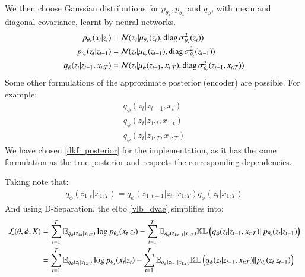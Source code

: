We then choose Gaussian distributions for $p_{\theta_x}, p_{\theta_z}$ and $q_\phi$, with mean and diagonal covariance, learnt by neural networks.
\begin{align}
    p_{\theta_x}(x_t \vert z_t) &= \mathcal{N}( x_t \vert \mu_{\theta_x}(z_t), \text{diag}\, \sigma_{\theta_x}^2(z_t))\\
    p_{\theta_z}(z_t \vert z_{t-1}) &= \mathcal{N}( z_t \vert \mu_{\theta_z}(z_{t-1}), \text{diag}\, \sigma_{\theta_z}^2(z_{t-1}))\\
    q_{\phi}(z_t \vert z_{t-1}, x_{t:T}) &= \mathcal{N}( z_t \vert \mu_{\phi}(z_{t-1}, x_{t:T}), \text{diag}\, \sigma_{\theta_z}^2(z_{t-1},x_{t:T}))
\end{align}
Some other formulations of the approximate posterior (encoder) are possible. For example:
\begin{align*}
    q_{\phi}(z_t \vert z_{t-1}, x_t) \\
    q_{\phi}(z_t \vert z_{1:t}, x_{1:t}) \\
    q_{\phi}(z_t \vert z_{1:T}, x_{1:T})
\end{align*}
We have chosen \ref{dkf_posterior} for the implementation, as it has the same formulation as the true posterior and respects the corresponding dependencies.

Taking note that:
\begin{align*}
    q_{\phi}(z_{1:t} \vert x_{1:T}) = q_{\phi}(z_{1:t-1} \vert z_t, x_{1:T}) q_{\phi}(z_t \vert x_{1:T})
\end{align*}
And using D-Separation, the \gls{elbo} \ref{vlb_dvae} simplifies into:
\begin{align}
    \mathcal{L}(\theta, \phi, X) &= \sum_{t=1}^T \mathbb{E}_{q_\phi(z_{1:t} \vert x_{1:T})} \log{p_{\theta_x}(x_t \vert z_t)} - \sum_{t=1}^T \mathbb{E}_{q_\phi(z_{1:t-1} \vert x_{1:T})} \mathbb{KL}\left( q_{\phi}(z_t \vert z_{t-1}, x_{t:T}) \vert\vert p_{\theta_z}(z_t \vert z_{t-1}) \right) \\
    &= \sum_{t=1}^T \mathbb{E}_{q_\phi(z_{t} \vert x_{1:T})} \log{p_{\theta_x}(x_t \vert z_t)} - \sum_{t=1}^T \mathbb{E}_{q_\phi(z_{t-1} \vert x_{1:T})} \mathbb{KL}\left( q_{\phi}(z_t \vert z_{t-1}, x_{t:T}) \vert\vert p_{\theta_z}(z_t \vert z_{t-1}) \right)
\end{align}

